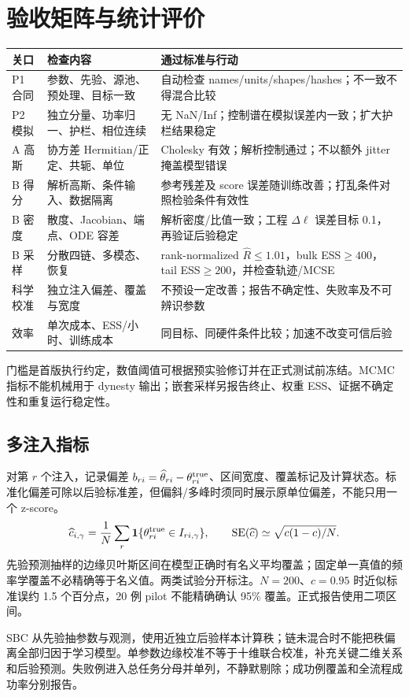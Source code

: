 \documentclass[UTF8,fontset=none,a4paper,11pt]{ctexart}
\newcommand{\chapterpage}[1]{\section{#1}}
\begin{document}
\clearpage\chapterpage{验收矩阵与统计评价}
\begin{longtable}{p{21mm}p{64mm}p{60mm}}\toprule
关口 & 检查内容 & 通过标准与行动\\\midrule\endhead
P1 合同 & 参数、先验、源池、预处理、目标一致 & 自动检查 names/units/shapes/hashes；不一致不得混合比较\\
P2 模拟 & 独立分量、功率归一、护栏、相位连续 & 无 NaN/Inf；控制谱在模拟误差内一致；扩大护栏结果稳定\\
A 高斯 & 协方差 Hermitian/正定、共轭、单位 & Cholesky 有效；解析控制通过；不以额外 jitter 掩盖模型错误\\
B 得分 & 解析高斯、条件输入、数据隔离 & 参考残差及 score 误差随训练改善；打乱条件对照检验条件有效性\\
B 密度 & 散度、Jacobian、端点、ODE 容差 & 解析密度/比值一致；工程 $\Delta\ell$ 误差目标 0.1，再验证后验稳定\\
B 采样 & 分散四链、多模态、恢复 & rank-normalized $\widehat R\le1.01$，bulk ESS$\ge400$，tail ESS$\ge200$，并检查轨迹/MCSE\\
科学校准 & 独立注入偏差、覆盖与宽度 & 不预设一定改善；报告不确定性、失败率及不可辨识参数\\
效率 & 单次成本、ESS/小时、训练成本 & 同目标、同硬件条件比较；加速不改变可信后验\\\bottomrule
\end{longtable}
门槛是首版执行约定，数值阈值可根据预实验修订并在正式测试前冻结。MCMC 指标不能机械用于 dynesty 输出；嵌套采样另报告终止、权重 ESS、证据不确定性和重复运行稳定性。
\subsection{多注入指标}
对第 $r$ 个注入，记录偏差 $b_{ri}=\widehat\theta_{ri}-\theta_{ri}^{\rm true}$、区间宽度、覆盖标记及计算状态。标准化偏差可除以后验标准差，但偏斜/多峰时须同时展示原单位偏差，不能只用一个 z-score。
\begin{equation}
\widehat c_{i,\gamma}=\frac1N\sum_r\mathbf1\{\theta_{ri}^{\rm true}\in I_{ri,\gamma}\},\qquad
\operatorname{SE}(\widehat c)\simeq\sqrt{c(1-c)/N}.
\end{equation}
先验预测抽样的边缘贝叶斯区间在模型正确时有名义平均覆盖；固定单一真值的频率学覆盖不必精确等于名义值。两类试验分开标注。$N=200$、$c=0.95$ 时近似标准误约 1.5 个百分点，20 例 pilot 不能精确确认 95\% 覆盖。正式报告使用二项区间。
\par SBC 从先验抽参数与观测，使用近独立后验样本计算秩；链未混合时不能把秩偏离全部归因于学习模型。单参数边缘校准不等于十维联合校准，补充关键二维关系和后验预测。失败例进入总任务分母并单列，不静默剔除；成功例覆盖和全流程成功率分别报告。
\end{document}
